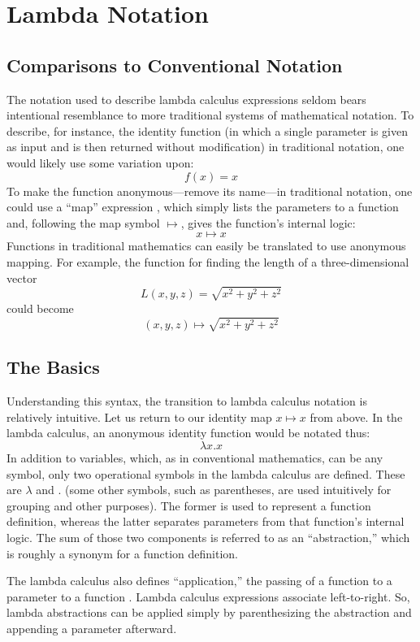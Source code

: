 \documentclass[twocolumn,titlepage,12pt]{article}
\begin{document}
\section{Lambda Notation}
\subsection{Comparisons to Conventional Notation}
The notation used to describe lambda calculus expressions seldom bears intentional resemblance to more traditional systems of mathematical notation. To describe, for instance, the identity function (in which a single parameter is given as input and is then returned without modification) in traditional notation, one would likely use some variation upon:
$$f(x)=x$$
To make the function anonymous---remove its name---in traditional notation, one could use a ``map'' expression \cite{intrographtheory}, which simply lists the parameters to a function and, following the map symbol $\mapsto$, gives the function's internal logic:
$$x\mapsto x$$
Functions in traditional mathematics can easily be translated to use anonymous mapping. For example, the function for finding the length of a three-dimensional vector
$$L(x,y,z)=\sqrt{x^2+y^2+z^2}$$
could become
$$(x,y,z) \mapsto \sqrt{x^2+y^2+z^2}$$

\subsection{The Basics}
Understanding this syntax, the transition to lambda calculus notation is relatively intuitive. Let us return to our identity map $x\mapsto x$ from above. In the lambda calculus, an anonymous identity function would be notated thus:
$$\lambda x.x$$
In addition to variables, which, as in conventional mathematics, can be any symbol, only two operational symbols in the lambda calculus are defined. These are $\lambda$ and $.$ (some other symbols, such as parentheses, are used intuitively for grouping and other purposes). The former is used to represent a function definition, whereas the latter separates parameters from that function's internal logic. The sum of those two components is referred to as an ``abstraction,'' which is roughly a synonym for a function definition.

The lambda calculus also defines ``application,'' the passing of a  function to a parameter to a function \cite{horowitz}. Lambda calculus expressions associate left-to-right. So, lambda abstractions can be applied simply by parenthesizing the abstraction and appending a parameter afterward.
\end{document}
